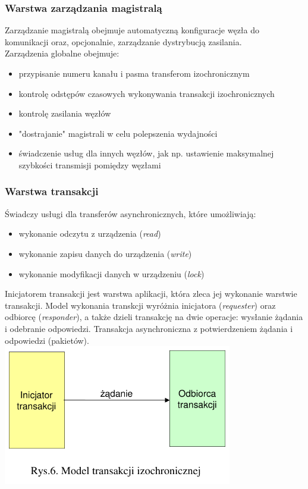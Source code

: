 	\subsubsection{Warstwa zarządzania magistralą}
	Zarządzanie magistralą obejmuje automatyczną konfiguracje węzła do komunikacji oraz, opcjonalnie, zarządzanie dystrybucją zasilania.\\
	Zarządzenia globalne obejmuje:
	\begin{itemize}
		\item przypisanie numeru kanału i pasma transferom izochronicznym
		\item kontrolę odstępów czasowych wykonywania transakcji izochronicznych
		\item kontrolę zasilania węzłów
		\item "dostrajanie" magistrali w celu polepszenia wydajności
		\item świadczenie usług dla innych węzłów, jak np. ustawienie maksymalnej szybkości transmisji pomiędzy węzłami
	\end{itemize}
	
	\subsubsection{Warstwa transakcji}
	Świadczy usługi dla transferów asynchronicznych, które umożliwiają:
	\begin{itemize}
		\item wykonanie odczytu z urządzenia (\emph{read})
		\item wykonanie zapisu danych do urządzenia (\emph{write})
		\item wykonanie modyfikacji danych w urządzeniu (\emph{lock})
	\end{itemize}
	Inicjatorem transakcji jest warstwa aplikacji, która zleca jej wykonanie warstwie transakcji. Model wykonania transkcji wyróżnia inicjatora (\emph{requester}) oraz odbiorcę (\emph{responder}), a także dzieli transakcję na dwie operacje: wysłanie żądania i odebranie odpowiedzi.
	Transakcja asynchroniczna z potwierdzeniem żądania i odpowiedzi (pakietów).\\
	\includegraphics[width=10cm]{./wyklady/FIREWIRE_8_1.pdf}
	
